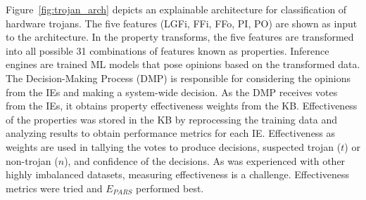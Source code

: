 

Figure~\ref{fig:trojan_arch} depicts an explainable architecture for
classification of hardware trojans. The five features (LGFi, FFi, FFo, PI, PO)
are shown as input to the architecture.  In the property transforms, the five
features are transformed into all possible 31 combinations of features known as
properties. Inference engines are trained ML models that pose opinions based on
the transformed data. The Decision-Making Process (DMP) is responsible for
considering the opinions from the IEs and making a system-wide decision. As the
DMP receives votes from the IEs, it obtains property effectiveness weights from
the KB. Effectiveness of the properties was stored in the KB by reprocessing the
training data and analyzing results to obtain performance metrics for each IE.
Effectiveness as weights are used in tallying the votes to produce decisions,
suspected trojan ($t$) or non-trojan ($n$), and confidence of the decisions.  As
was experienced with other highly imbalanced datasets, measuring effectiveness
is a challenge. Effectiveness metrics were tried and $E_{PARS}$ performed
best\cite{whitten2024naecon}.

